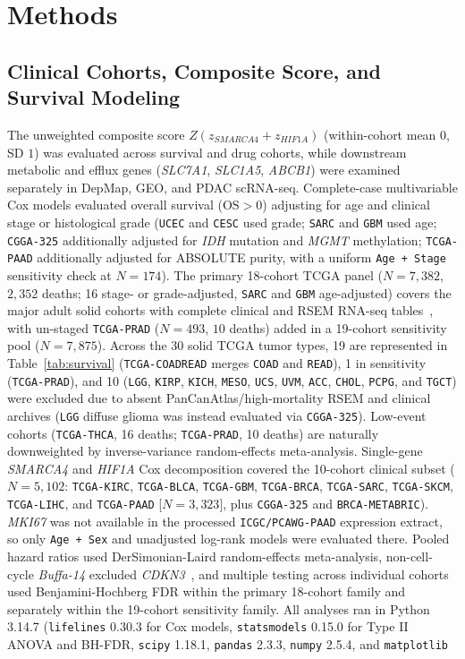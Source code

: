\documentclass[11pt]{article}
\begin{document}
\section{Methods}

\subsection{Clinical Cohorts, Composite Score, and Survival Modeling}
The unweighted composite score $Z(z_{\textit{SMARCA4}} + z_{\textit{HIF1A}})$ (within-cohort mean $0$, SD $1$) was evaluated across survival and drug cohorts, while downstream metabolic and efflux genes (\textit{SLC7A1}, \textit{SLC1A5}, \textit{ABCB1}) were examined separately in DepMap, GEO, and PDAC scRNA-seq. Complete-case multivariable Cox models evaluated overall survival ($\text{OS} > 0$) adjusting for age and clinical stage or histological grade (\texttt{UCEC} and \texttt{CESC} used grade; \texttt{SARC} and \texttt{GBM} used age; \texttt{CGGA-325} additionally adjusted for \textit{IDH} mutation and \textit{MGMT} methylation; \texttt{TCGA-PAAD} additionally adjusted for ABSOLUTE purity, with a uniform \texttt{Age + Stage} sensitivity check at $N = 174$). The primary 18-cohort TCGA panel ($N = 7,382$, $2,352$ deaths; 16 stage- or grade-adjusted, \texttt{SARC} and \texttt{GBM} age-adjusted) covers the major adult solid cohorts with complete clinical and RSEM RNA-seq tables~\cite{tcga2018}, with un-staged \texttt{TCGA-PRAD} ($N = 493$, $10$ deaths) added in a 19-cohort sensitivity pool ($N = 7,875$). Across the 30 solid TCGA tumor types, 19 are represented in Table~\ref{tab:survival} (\texttt{TCGA-COADREAD} merges \texttt{COAD} and \texttt{READ}), 1 in sensitivity (\texttt{TCGA-PRAD}), and 10 (\texttt{LGG}, \texttt{KIRP}, \texttt{KICH}, \texttt{MESO}, \texttt{UCS}, \texttt{UVM}, \texttt{ACC}, \texttt{CHOL}, \texttt{PCPG}, and \texttt{TGCT}) were excluded due to absent PanCanAtlas/high-mortality RSEM and clinical archives (\texttt{LGG} diffuse glioma was instead evaluated via \texttt{CGGA-325}). Low-event cohorts (\texttt{TCGA-THCA}, 16 deaths; \texttt{TCGA-PRAD}, 10 deaths) are naturally downweighted by inverse-variance random-effects meta-analysis. Single-gene \textit{SMARCA4} and \textit{HIF1A} Cox decomposition covered the 10-cohort clinical subset ($N = 5,102$: \texttt{TCGA-KIRC}, \texttt{TCGA-BLCA}, \texttt{TCGA-GBM}, \texttt{TCGA-BRCA}, \texttt{TCGA-SARC}, \texttt{TCGA-SKCM}, \texttt{TCGA-LIHC}, and \texttt{TCGA-PAAD} [$N = 3,323$], plus \texttt{CGGA-325} and \texttt{BRCA-METABRIC}). \textit{MKI67} was not available in the processed \texttt{ICGC/PCAWG-PAAD} expression extract, so only \texttt{Age + Sex} and unadjusted log-rank models were evaluated there. Pooled hazard ratios used DerSimonian-Laird random-effects meta-analysis, non-cell-cycle \textit{Buffa-14} excluded \textit{CDKN3}~\cite{buffa2010}, and multiple testing across individual cohorts used Benjamini-Hochberg FDR within the primary 18-cohort family and separately within the 19-cohort sensitivity family. All analyses ran in Python 3.14.7 (\texttt{lifelines} 0.30.3 for Cox models, \texttt{statsmodels} 0.15.0 for Type II ANOVA and BH-FDR, \texttt{scipy} 1.18.1, \texttt{pandas} 2.3.3, \texttt{numpy} 2.5.4, and \texttt{matplotlib} 
\end{document}

